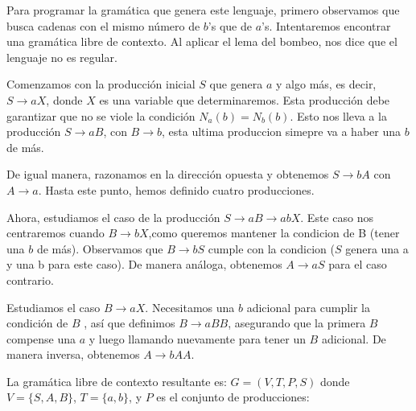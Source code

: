 \documentclass{article}
\begin{document}
            Para programar la gramática que genera este lenguaje, primero observamos que busca cadenas con el mismo número de $b$'s que de $a$'s. 
            Intentaremos encontrar una gramática libre de contexto. Al aplicar el lema del bombeo, nos dice que el lenguaje no es regular.
            \vspace{\baselineskip} %

            Comenzamos con la producción inicial $S$ que genera $a$ y algo más, es decir, $S \rightarrow aX$, donde $X$ es una variable que determinaremos. 
            Esta producción debe garantizar que no se viole la condición $N_a(b) = N_b(b)$. Esto nos lleva a la producción $S \rightarrow aB$, 
            con $B \rightarrow b$, esta ultima produccion simepre va a haber una $b$ de más.
            \vspace{\baselineskip} %

            De igual manera, razonamos en la dirección opuesta 
            y obtenemos $S \rightarrow bA$ con $A \rightarrow a$. 
            Hasta este punto, hemos definido cuatro producciones.
            \vspace{\baselineskip} %

            Ahora, estudiamos el caso de la producción $S \rightarrow aB \rightarrow abX$. Este caso nos centraremos cuando $B \rightarrow bX$,como queremos mantener la 
            condicion de B (tener una $b$ de más). Observamos que $B \rightarrow bS$ cumple con la condicion ($S$ genera una a y una b para este caso). 
            De manera análoga, obtenemos $A \rightarrow aS$ para el caso contrario.
            \vspace{\baselineskip} %

            Estudiamos el caso $B \rightarrow aX$. 
            Necesitamos una $b$ adicional para cumplir la condición de $B$ , 
            así que definimos $B \rightarrow aBB$, asegurando que la primera 
            $B$ compense una $a$ y luego llamando nuevamente para tener un $B$ 
            adicional. De manera inversa, obtenemos $A \rightarrow bAA$.
            \vspace{\baselineskip} %

            La gramática libre de contexto resultante es:
            \vspace{\baselineskip} %
            $G = (V, T, P, S)$ donde $V = \{S, A, B\}$, $T = \{a, b\}$, y $P$ es el conjunto de producciones:
            \vspace{\baselineskip} %
\end{document}
